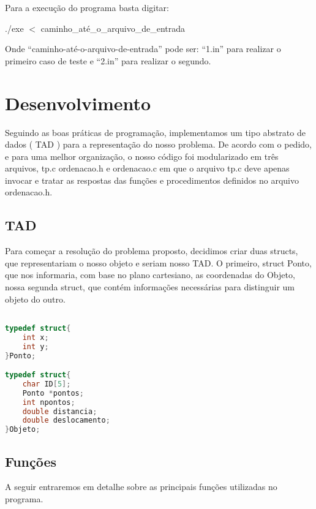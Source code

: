 \documentclass{article}
\begin{document}
Para a execução do programa basta digitar:
\begin{tcolorbox}[title=,width=\linewidth]
    ./exe $<$ caminho\_até\_o\_arquivo\_de\_entrada
\end{tcolorbox}

Onde “caminho-até-o-arquivo-de-entrada” pode ser: “1.in” para realizar o primeiro caso de teste e “2.in” para realizar o segundo.

\clearpage



\section{Desenvolvimento}

Seguindo as boas práticas de programação, implementamos um tipo abstrato de dados ( TAD ) para a representação do nosso problema. De acordo com o pedido, e para uma melhor organização, o nosso código foi modularizado em três arquivos, tp.c ordenacao.h e ordenacao.c em que o arquivo tp.c deve apenas invocar e tratar as respostas das funções e procedimentos definidos no arquivo ordenacao.h.

\subsection{TAD}
Para começar a resolução do problema proposto, decidimos criar duas structs, que representariam o nosso objeto e seriam nosso TAD. O primeiro, struct Ponto, que nos informaria, com base no plano cartesiano, as coordenadas do Objeto, 
nossa segunda struct, que contém informações necessárias para distinguir um objeto do outro.

\begin{lstlisting}[caption={TAD's representando Ponto e Objeto, respectivamente},label={lst:cod1},language=C]

typedef struct{
    int x;
    int y;
}Ponto;

typedef struct{
    char ID[5];
    Ponto *pontos;
    int npontos;
    double distancia;
    double deslocamento;
}Objeto;

\end{lstlisting}

\subsection{Funções}

A seguir entraremos em detalhe sobre as principais funções utilizadas no programa.
\end{document}
